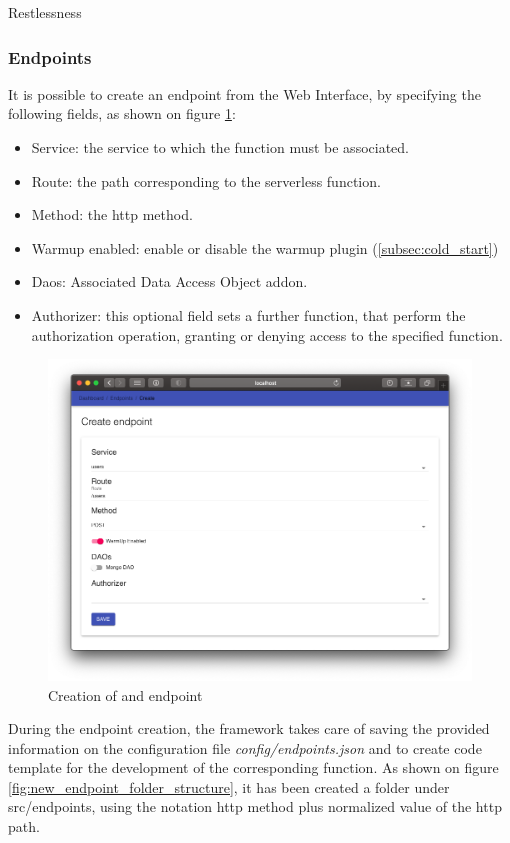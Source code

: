 \begin{chapter}{Restlessness}
    \subsubsection{Endpoints}
    \label{subsec:endpoints}
    It is possible to create an endpoint from the Web Interface, by specifying the
    following fields, as shown on figure \ref{fig:wi_create_endpoint}:
    \begin{itemize}
        \item Service: the service to which the function must be associated.
        \item Route: the path corresponding to the serverless function.
        \item Method: the http method.
        \item Warmup enabled: enable or disable the warmup plugin
            (\ref{subsec:cold_start})
        \item Daos: Associated Data Access Object addon.
        \item Authorizer: this optional field sets a further function, that
            perform the authorization operation, granting or denying access to
            the specified function.
    \end{itemize}

    \begin{figure}
        \centering
        \includegraphics[width=\linewidth]{source/images/rln-wi-create-endpoint.png}
        \caption{Creation of and endpoint}
        \label{fig:wi_create_endpoint}
    \end{figure}

    During the endpoint creation, the framework takes care of saving the provided
    information on the configuration file \textit{config/endpoints.json} and to
    create code template for the development of the corresponding function.
    As shown on figure \ref{fig:new_endpoint_folder_structure}, it has been created a
    folder under src/endpoints, using the notation http method plus normalized value
    of the http path.


\end{chapter}
